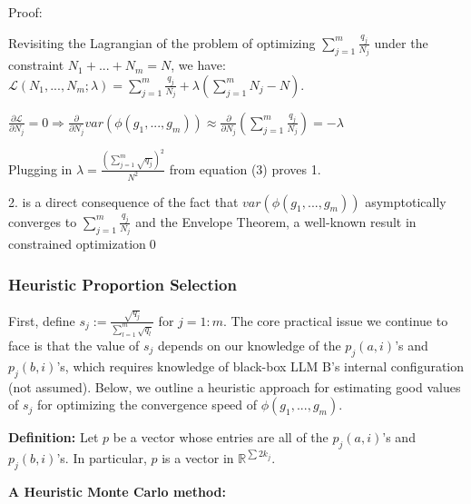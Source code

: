 \documentclass{article}
\begin{document}
Proof:

Revisiting the Lagrangian of the problem of optimizing $\displaystyle \sum _{j=1}^{m}\frac{q_{j}}{N_{j}}$ under the constraint $\displaystyle N_{1} +...+N_{m} =N$, we have: $\displaystyle \mathcal{L}\left( N_{1} ,...,N_{m} ;\lambda \right) =\sum _{j=1}^{m}\frac{q_{j}}{N_{j}} +\lambda \left(\sum _{j=1}^{m} N_{j} -N\right)$.

$\displaystyle \frac{\partial \mathcal{L}}{\partial N_{j}} =0\Longrightarrow \frac{\partial }{\partial N_{j}} var\left( \phi \left( g_{1} ,...,g_{m}\right)\right) \approx \frac{\partial }{\partial N_{j}}\left(\sum _{j=1}^{m}\frac{q_{j}}{N_{j}}\right) =-\lambda $

Plugging in $\displaystyle \lambda =\frac{\left(\sum _{j=1}^{m}\sqrt{q_{j}}\right)^{2}}{N^{2}}$ from equation (3) proves 1.



2. is a direct consequence of the fact that $\displaystyle var\left( \phi \left( g_{1} ,...,g_{m}\right)\right)$ asymptotically converges to $\displaystyle \sum _{j=1}^{m}\frac{q_{j}}{N_{j}}$ and the Envelope Theorem, a well-known result in constrained optimization\qed 



\subsubsection{Heuristic Proportion Selection}

First, define $\displaystyle s_{j} :=\frac{\sqrt{q_{j}}}{\sum _{l=1}^{m}\sqrt{q_{l}}}$ for $\displaystyle j=1:m$. The core practical issue we continue to face is that the value of $\displaystyle s_{j}$ depends on our knowledge of the $\displaystyle p_{j}\left( a,i\right)$'s and $\displaystyle p_{j}\left( b,i\right)$'s, which requires knowledge of black-box LLM B's internal configuration (not assumed). Below, we outline a heuristic approach for estimating good values of $\displaystyle s_{j}$ for optimizing the convergence speed of $\displaystyle \phi \left( g_{1} ,...,g_{m}\right)$.



\textbf{Definition:} Let $\displaystyle p$ be a vector whose entries are all of the $\displaystyle p_{j}\left( a,i\right)$'s and $\displaystyle p_{j}\left( b,i\right)$'s. In particular, $\displaystyle p$ is a vector in $\displaystyle \mathbb{R}^{\sum 2k_{j}}$.



\textbf{A Heuristic Monte Carlo method:}
\end{document}
